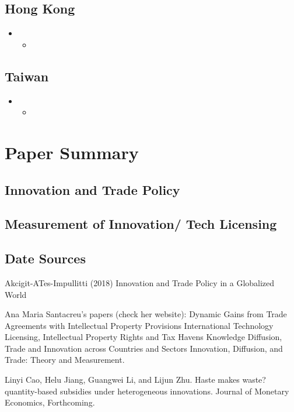 \documentclass[12pt]{article} %
\begin{document}
	\subsection{Hong Kong}
		\begin{itemize}
		\item	
			\begin{itemize}
				\item	
			\end{itemize}
		\end{itemize}
		
	\subsection{Taiwan}
		\begin{itemize}
		\item	
			\begin{itemize}
				\item	
			\end{itemize}
		\end{itemize}
		
		
\section{Paper Summary}
	\subsection{Innovation and Trade Policy}
	
	\subsection{Measurement of Innovation/ Tech Licensing}
	
	\subsection{Date Sources}
	
	Akcigit-ATes-Impullitti (2018) Innovation and Trade Policy in a Globalized World \cite{AkcigitAtesImpullitti2018}
 
Ana Maria Santacreu’s papers (check her website):  
Dynamic Gains from Trade Agreements with Intellectual Property Provisions \cite{Santacreu2022}
International Technology Licensing, Intellectual Property Rights and Tax Havens \cite{Santacreu2023}
Knowledge Diffusion, Trade and Innovation across Countries and Sectors  \cite{CaiLiSantacreu2022}
 Innovation, Diffusion, and Trade: Theory and Measurement.  \cite{Santacreu2015}

Linyi Cao, Helu Jiang, Guangwei Li, and Lijun Zhu. Haste makes waste? quantity-based subsidies under heterogeneous innovations. Journal of Monetary Economics, Forthcoming.\cite{CaoJiangLiZhu2023}





\newpage

\footnotesize


\end{document}
